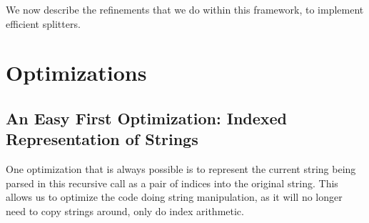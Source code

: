     We now describe the refinements that we do within this framework, to implement efficient splitters.
    
\section{Optimizations}
  \subsection{An Easy First Optimization: Indexed Representation of Strings}
    One optimization that is always possible is to represent the current string being parsed in this recursive call as a pair of indices into the original string.  This allows us to optimize the code doing string manipulation, as it will no longer need to copy strings around, only do index arithmetic.
    
    
